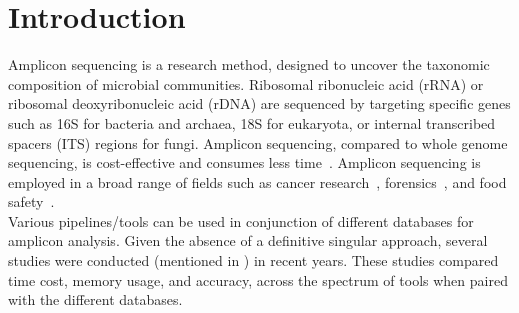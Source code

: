 \chapter{Introduction}\label{chap:Introduction}

Amplicon sequencing is a research method, designed to uncover the taxonomic composition of microbial communities. Ribosomal ribonucleic acid (rRNA) or ribosomal deoxyribonucleic acid (rDNA) are sequenced by targeting specific genes such as 16S for bacteria and archaea, 18S for eukaryota, or internal transcribed spacers (ITS) regions for fungi. Amplicon sequencing, compared to whole genome sequencing, is cost-effective and consumes less time~\cite{fricker_what_2019}. Amplicon sequencing is employed in a broad range of fields such as cancer research~\cite{guerrero-preston_16s_2016}, forensics~\cite{zhang_application_2023}, and food safety~\cite{mira_miralles_high-throughput_2019}.\\
Various pipelines/tools can be used in conjunction of different databases for amplicon analysis. Given the absence of a definitive singular approach, several studies were conducted (mentioned in ) in recent years. These studies compared time cost, memory usage, and accuracy, across the spectrum of tools when paired with the different databases.




